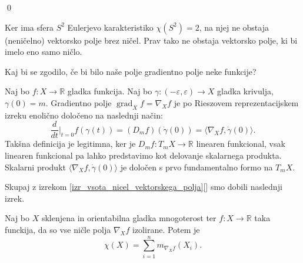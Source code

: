 \qed

\begin{primer}
    Ker ima sfera $S^2$ Eulerjevo karakteristiko $\chi(S^2) = 2$, na njej ne obstaja (neničelno) vektorsko polje brez ničel. Prav tako ne obstaja vektorsko polje, ki bi imelo eno samo ničlo.
    \end{primer}


Kaj bi se zgodilo, če bi bilo naše polje gradientno polje neke funkcije?

\begin{definicija}
\label{def_gradientno_polje}
Naj bo $f: X \to  \mathbb{R}$ gladka funkcija. Naj bo $\gamma: (-\varepsilon, \varepsilon) \to  X$ gladka krivulja, $\gamma(0) = m$. Gradientno polje $\operatorname{grad}_X f = \nabla_X f$ je po Rieszovem reprezentacijskem izreku enolično določeno na naslednji način:
\[ \frac{d}{dt} \bigg|_{t = 0} f(\gamma(t)) = (D_mf)(\dot{\gamma}(0)) = \langle \nabla_X f, \dot{\gamma}(0) \rangle. \]  
Takšna definicija je legitimna, ker je $D_mf: T_mX \to  \mathbb{R}$ linearen funkcional, vsak linearen funkcional pa lahko predstavimo kot delovanje skalarnega produkta. Skalarni produkt $\langle \nabla_X f, \dot{\gamma}(0) \rangle$ je določen s prvo fundamentalno formo na $T_mX$.
\end{definicija}

Skupaj z izrekom \ref{izr_vsota_nicel_vektorskega_polja}[] smo dobili naslednji izrek.
\begin{izrek}
\label{izr_vsota_nicel_gradientnih_polj}
 Naj bo $X$ sklenjena in orientabilna gladka mnogoterost ter $f: X \to  \mathbb{R}$ taka funckija, da so vse ničle polja $\nabla_X f$ izolirane. Potem je \begin{equation*}
 \chi(X) = \sum_{i = 1}^{n} m_{\nabla_X f} (X_i).
 \end{equation*}  
\end{izrek}

